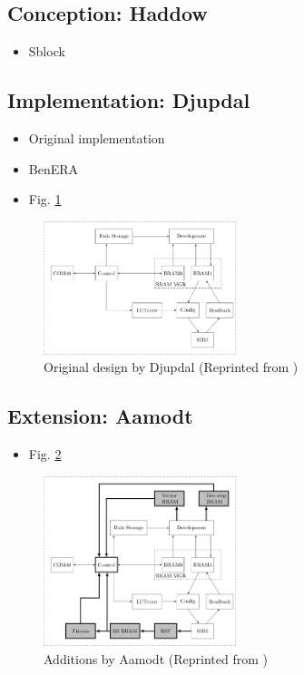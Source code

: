 \subsection{Conception: Haddow \cite{haddow2000sblock}}

\begin{itemize}
    \item Sblock
\end{itemize}

\subsection{Implementation: Djupdal \cite{djupdal2003sblock}}

\begin{itemize}
    \item Original implementation
    \item BenERA
    \item Fig. \ref{fig:ca-djupdal}
\end{itemize}

\begin{figure}[!ht]
    \centering
    \includegraphics[width=0.5\textwidth]{figures/ca-djupdal}
    \caption{Original design by Djupdal (Reprinted from \cite{stovneng2014sblock})}
    \label{fig:ca-djupdal}
\end{figure}

\subsection{Extension: Aamodt \cite{aamodt2005sblock}}

\begin{itemize}
    \item Fig. \ref{fig:ca-aamodt}
\end{itemize}

\begin{figure}[!ht]
    \centering
    \includegraphics[width=0.5\textwidth]{figures/ca-aamodt}
    \caption{Additions by Aamodt (Reprinted from \cite{stovneng2014sblock})}
    \label{fig:ca-aamodt}
\end{figure}

